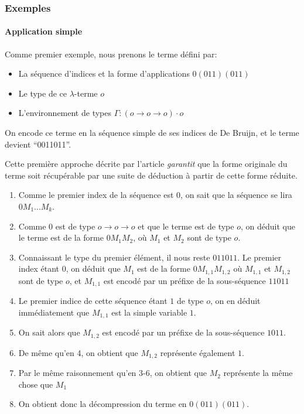 \documentclass[titlepage]{article}
\providecommand{\tightlist}{%
  \setlength{\itemsep}{0pt}\setlength{\parskip}{0pt}}
\let\oldparagraph\paragraph
\renewcommand{\paragraph}[1]{\oldparagraph{#1}\mbox{}}
\begin{document}
\subsubsection{Exemples}\label{exemples}

\paragraph{Application simple}

Comme premier exemple, nous prenons le terme défini par:

\begin{itemize}
\tightlist
\item
  La séquence d'indices et la forme d'applications \(0(011)(011)\)
\item
  Le type de ce \(\lambda\)-terme \(o\)
\item
  L'environnement de types
  \(\Gamma: (o \rightarrow o \rightarrow o) \cdot o\)
\end{itemize}

On encode ce terme en la séquence simple de ses indices de De Bruijn, et
le terme devient ``0011011''.

Cette première approche décrite par l'article \emph{garantit} que la
forme originale du terme soit récupérable par une suite de déduction à
partir de cette forme réduite.

\begin{enumerate}
\def\labelenumi{\arabic{enumi}.}
\tightlist
\item
  Comme le premier index de la séquence est 0, on sait que la séquence
  se lira \(0M_1...M_k\).
\item
  Comme \(0\) est de type \(o \rightarrow o \rightarrow o\) et que le
  terme est de type \(o\), on déduit que le terme est de la forme
  \(0M_1M_2\), où \(M_1\) et \(M_2\) sont de type \(o\).
\item
  Connaissant le type du premier élément, il nous reste \(011011\). Le
  premier index étant 0, on déduit que \(M_1\) est de la forme
  \(0M_{1,1}M_{1,2}\) où \(M_{1,1}\) et \(M_{1,2}\) sont de type \(o\),
  et \(M_{1,1}\) est encodé par un préfixe de la sous-séquence \(11011\)
\item
  Le premier indice de cette séquence étant \(1\) de type \(o\), on en
  déduit immédiatement que \(M_{1,1}\) est la simple variable \(1\).
\item
  On sait alors que \(M_{1,2}\) est encodé par un préfixe de la
  sous-séquence \(1011\).
\item
  De même qu'en 4, on obtient que \(M_{1,2}\) représente également
  \(1\).
\item
  Par le même raisonnement qu'en 3-6, on obtient que \(M_2\) représente
  la même chose que \(M_1\)
\item
  On obtient donc la décompression du terme en \(0(011)(011)\).
\end{enumerate}
\end{document}
